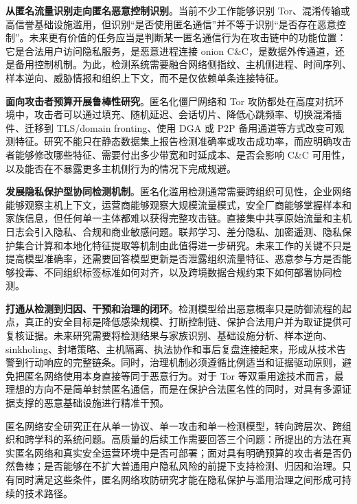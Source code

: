 \textbf{从匿名流量识别走向匿名恶意控制识别}。当前不少工作能够识别 Tor、混淆传输或高信誉基础设施滥用，但识别“是否使用匿名通信”并不等于识别“是否存在恶意控制”。未来更有价值的任务应当是判断某一匿名通信行为在攻击链中的功能位置：它是合法用户访问隐私服务，是恶意进程连接 onion C\&C，是数据外传通道，还是备用控制机制。为此，检测系统需要融合网络侧指纹、主机侧进程、时间序列、样本逆向、威胁情报和组织上下文，而不是仅依赖单条连接特征。

\textbf{面向攻击者预算开展鲁棒性研究}。匿名化僵尸网络和 Tor 攻防都处在高度对抗环境中，攻击者可以通过填充、随机延迟、会话切片、降低心跳频率、切换混淆插件、迁移到 TLS/domain fronting、使用 DGA 或 P2P 备用通道等方式改变可观测特征。研究不能只在静态数据集上报告检测准确率或攻击成功率，而应明确攻击者能够修改哪些特征、需要付出多少带宽和时延成本、是否会影响 C\&C 可用性，以及能否在不暴露更多主机侧行为的情况下完成规避。

\textbf{发展隐私保护型协同检测机制}。匿名化滥用检测通常需要跨组织可见性，企业网络能够观察主机上下文，运营商能够观察大规模流量模式，安全厂商能够掌握样本和家族信息，但任何单一主体都难以获得完整攻击链。直接集中共享原始流量和主机日志会引入隐私、合规和商业敏感问题。联邦学习、差分隐私、加密遥测、隐私保护集合计算和本地化特征提取等机制由此值得进一步研究。未来工作的关键不只是提高模型准确率，还需要回答模型更新是否泄露组织流量特征、恶意参与方是否能够投毒、不同组织标签标准如何对齐，以及跨境数据合规约束下如何部署协同检测。

\textbf{打通从检测到归因、干预和治理的闭环}。检测模型给出恶意概率只是防御流程的起点，真正的安全目标是降低感染规模、打断控制链、保护合法用户并为取证提供可复核证据。未来研究需要将检测结果与家族识别、基础设施分析、样本逆向、sinkholing、封堵策略、主机隔离、执法协作和事后复盘连接起来，形成从技术告警到行动响应的完整链条。同时，治理机制必须遵循比例适当和证据驱动原则，避免把匿名网络使用本身直接等同于恶意行为。对于 Tor 等双重用途技术而言，最理想的方向不是简单封禁匿名通信，而是在保护合法匿名性的同时，对具有多源证据支撑的恶意基础设施进行精准干预。

匿名网络安全研究正在从单一协议、单一攻击和单一检测模型，转向跨层次、跨组织和跨学科的系统问题。高质量的后续工作需要回答三个问题：所提出的方法在真实匿名网络和真实安全运营环境中是否可部署；面对具有明确预算的攻击者是否仍然鲁棒；是否能够在不扩大普通用户隐私风险的前提下支持检测、归因和治理。只有同时满足这些条件，匿名网络攻防研究才能在隐私保护与滥用治理之间形成可持续的技术路径。